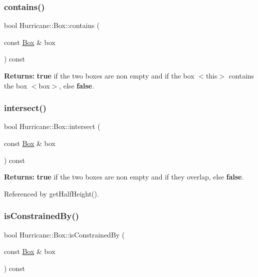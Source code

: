 \subsubsection{\texorpdfstring{contains()}{contains()}\hspace{0.1cm}{\footnotesize\ttfamily [3/3]}}
{\footnotesize\ttfamily bool Hurricane\+::\+Box\+::contains (\begin{DoxyParamCaption}\item[{const \hyperlink{classHurricane_1_1Box}{Box} \&}]{box }\end{DoxyParamCaption}) const}

{\bfseries Returns\+:} {\bfseries true} if the two boxes are non empty and if the box {\ttfamily $<$this$>$} contains the box {\ttfamily $<$box$>$}, else {\bfseries false}. \mbox{\label{classHurricane_1_1Box_ae76b57bf6399b29021813da8d3f306ec}} 
\subsubsection{\texorpdfstring{intersect()}{intersect()}}
{\footnotesize\ttfamily bool Hurricane\+::\+Box\+::intersect (\begin{DoxyParamCaption}\item[{const \hyperlink{classHurricane_1_1Box}{Box} \&}]{box }\end{DoxyParamCaption}) const}

{\bfseries Returns\+:} {\bfseries true} if the two boxes are non empty and if they overlap, else {\bfseries false}. 

Referenced by get\+Half\+Height().

\mbox{\label{classHurricane_1_1Box_a70d832443d97cb40ec7cb4f0f959a977}} 
\subsubsection{\texorpdfstring{is\+Constrained\+By()}{isConstrainedBy()}}
{\footnotesize\ttfamily bool Hurricane\+::\+Box\+::is\+Constrained\+By (\begin{DoxyParamCaption}\item[{const \hyperlink{classHurricane_1_1Box}{Box} \&}]{box }\end{DoxyParamCaption}) const}

